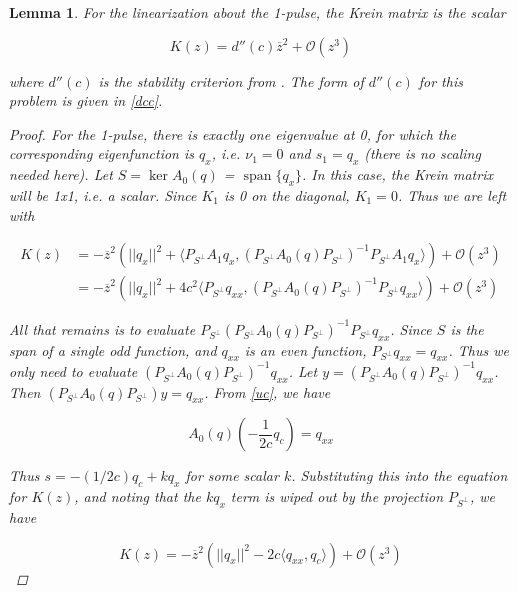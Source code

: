 \documentclass[12pt]{article}
\DeclareMathOperator{\spn}{span}
\newtheorem{lemma}{Lemma}
\begin{document}
\begin{lemma}\label{Krein1pulse}
For the linearization about the 1-pulse, the Krein matrix is the scalar

\begin{equation}
K(z) = d''(c) \overline{z}^2 + \mathcal{O}(z^3)
\end{equation}

where $d''(c)$ is the stability criterion from \cite{Grillakis1987}. The form of $d''(c)$ for this problem is given in \eqref{dcc}.

\begin{proof}

For the 1-pulse, there is exactly one eigenvalue at 0, for which the corresponding eigenfunction is $q_x$, i.e. $\nu_1 = 0$ and $s_1 = q_x$ (there is no scaling needed here). Let $S = \ker A_0(q)$ = $\spn \{q_x\}$. In this case, the Krein matrix will be 1x1, i.e. a scalar. Since $K_1$ is 0 on the diagonal, $K_1 = 0$. Thus we are left with

\begin{align*}
K(z) &= -\overline{z}^2 \left( ||q_x||^2 + \langle P_{S^\perp} A_1 q_x, (P_{S^\perp} A_0(q) P_{S^\perp})^{-1} P_{S^\perp} A_1 q_x \rangle \right) + \mathcal{O}(z^3) \\
&= -\overline{z}^2 \left( ||q_x||^2 + 4 c^2 \langle P_{S^\perp} q_{xx}, (P_{S^\perp} A_0(q) P_{S^\perp})^{-1} P_{S^\perp} q_{xx} \rangle \right) + \mathcal{O}(z^3)
\end{align*}

All that remains is to evaluate $P_{S^\perp} (P_{S^\perp} A_0(q) P_{S^\perp})^{-1} P_{S^\perp} q_{xx}$. Since $S$ is the span of a single odd function, and $q_{xx}$ is an even function, $P_{S^\perp} q_{xx} = q_{xx}$. Thus we only need to evaluate $(P_{S^\perp} A_0(q) P_{S^\perp})^{-1} q_{xx}$. Let $y = (P_{S^\perp} A_0(q) P_{S^\perp})^{-1} q_{xx}$. Then $(P_{S^\perp} A_0(q) P_{S^\perp})y = q_{xx}$. From \eqref{uc}, we have

\begin{equation*}\label{uc}
A_0(q) \left( -\frac{1}{2c} q_c \right) = q_{xx}
\end{equation*}

Thus $s = -(1/2c) q_c + k q_x$ for some scalar $k$. Substituting this into the equation for $K(z)$, and noting that the $k q_x$ term is wiped out by the projection $P_{S^\perp}$, we have

\[
K(z) = -\overline{z}^2 \left( ||q_x||^2 - 2c \langle q_{xx}, q_c \rangle \right) + \mathcal{O}(z^3)
\]


\end{proof}
\end{lemma}
\end{document}
